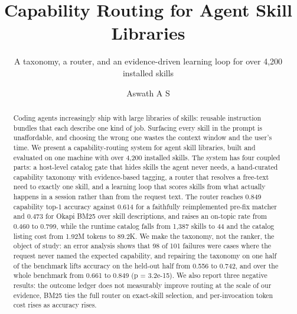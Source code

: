 \documentclass[sigconf,acmsmall]{acmart}
\begin{document}
\title{Capability Routing for Agent Skill Libraries}
\subtitle{A taxonomy, a router, and an evidence-driven learning loop for over 4,200 installed skills}
\author{Aswath A S}
\renewcommand{\shortauthors}{Aswath A S}
\begin{abstract}
Coding agents increasingly ship with large libraries of skills: reusable instruction bundles that each describe one kind of job. Surfacing every skill in the prompt is unaffordable, and choosing the wrong one wastes the context window and the user's time. We present a capability-routing system for agent skill libraries, built and evaluated on one machine with over 4,200 installed skills. The system has four coupled parts: a host-level catalog gate that hides skills the agent never needs, a hand-curated capability taxonomy with evidence-based tagging, a router that resolves a free-text need to exactly one skill, and a learning loop that scores skills from what actually happens in a session rather than from the request text. The router reaches 0.849 capability top-1 accuracy against 0.614 for a faithfully reimplemented pre-fix matcher and 0.473 for Okapi BM25 over skill descriptions, and raises an on-topic rate from 0.460 to 0.799, while the runtime catalog falls from 1,387 skills to 44 and the catalog listing cost from 1.92M tokens to 89.2K. We make the taxonomy, not the ranker, the object of study: an error analysis shows that 98 of 101 failures were cases where the request never named the expected capability, and repairing the taxonomy on one half of the benchmark lifts accuracy on the held-out half from 0.556 to 0.742, and over the whole benchmark from 0.661 to 0.849 (p = 3.2e-15). We also report three negative results: the outcome ledger does not measurably improve routing at the scale of our evidence, BM25 ties the full router on exact-skill selection, and per-invocation token cost rises as accuracy rises.
\end{abstract}
\maketitle
\end{document}
